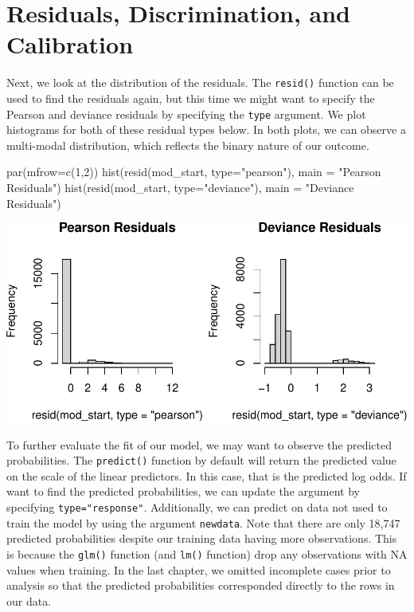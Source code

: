\documentclass[
  letterpaper,
]{krantz}
\makeatletter
\newenvironment{Shaded}{\begin{snugshade}}{\end{snugshade}}
\newcommand{\AttributeTok}[1]{\textcolor[rgb]{0.40,0.45,0.13}{#1}}
\newcommand{\DecValTok}[1]{\textcolor[rgb]{0.68,0.00,0.00}{#1}}
\newcommand{\FunctionTok}[1]{\textcolor[rgb]{0.28,0.35,0.67}{#1}}
\newcommand{\NormalTok}[1]{\textcolor[rgb]{0.00,0.23,0.31}{#1}}
\newcommand{\StringTok}[1]{\textcolor[rgb]{0.13,0.47,0.30}{#1}}
\newenvironment{kframe}{%
\medskip{}
\setlength{\fboxsep}{.8em}
 \def\at@end@of@kframe{}%
 \ifinner\ifhmode%
  \def\at@end@of@kframe{\end{minipage}}%
  \begin{minipage}{\columnwidth}%
 \fi\fi%
 \def\FrameCommand##1{\hskip\@totalleftmargin \hskip-\fboxsep
 \colorbox{shadecolor}{##1}\hskip-\fboxsep
     \hskip-\linewidth \hskip-\@totalleftmargin \hskip\columnwidth}%
 \MakeFramed {\advance\hsize-\width
   \@totalleftmargin\z@ \linewidth\hsize
   \@setminipage}}%
 {\par\unskip\endMakeFramed%
 \at@end@of@kframe}
\renewenvironment{Shaded}{\begin{kframe}}{\end{kframe}}
\makeatother
\begin{document}
\section{Residuals, Discrimination, and
Calibration}\label{residuals-discrimination-and-calibration}

Next, we look at the distribution of the residuals. The \texttt{resid()}
function can be used to find the residuals again, but this time we might
want to specify the Pearson and deviance residuals by specifying the
\texttt{type} argument. We plot histograms for both of these residual
types below. In both plots, we can observe a multi-modal distribution,
which reflects the binary nature of our outcome.

\begin{Shaded}
\begin{Highlighting}[]
\FunctionTok{par}\NormalTok{(}\AttributeTok{mfrow=}\FunctionTok{c}\NormalTok{(}\DecValTok{1}\NormalTok{,}\DecValTok{2}\NormalTok{))}
\FunctionTok{hist}\NormalTok{(}\FunctionTok{resid}\NormalTok{(mod\_start, }\AttributeTok{type=}\StringTok{"pearson"}\NormalTok{), }\AttributeTok{main =} \StringTok{"Pearson Residuals"}\NormalTok{)}
\FunctionTok{hist}\NormalTok{(}\FunctionTok{resid}\NormalTok{(mod\_start, }\AttributeTok{type=}\StringTok{"deviance"}\NormalTok{), }\AttributeTok{main =} \StringTok{"Deviance Residuals"}\NormalTok{)}
\end{Highlighting}
\end{Shaded}

\begin{center}
\includegraphics[width=1\textwidth,height=\textheight]{book/logistic_regression_files/figure-pdf/unnamed-chunk-7-1.pdf}
\end{center}

To further evaluate the fit of our model, we may want to observe the
predicted probabilities. The \texttt{predict()} function by default will
return the predicted value on the scale of the linear predictors. In
this case, that is the predicted log odds. If want to find the predicted
probabilities, we can update the argument by specifying
\texttt{type="response"}. Additionally, we can predict on data not used
to train the model by using the argument \texttt{newdata}. Note that
there are only 18,747 predicted probabilities despite our training data
having more observations. This is because the \texttt{glm()} function
(and \texttt{lm()} function) drop any observations with NA values when
training. In the last chapter, we omitted incomplete cases prior to
analysis so that the predicted probabilities corresponded directly to
the rows in our data.
\end{document}
